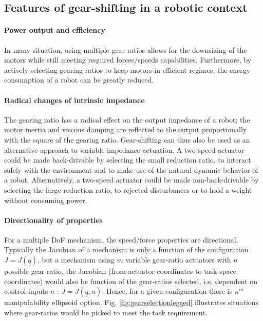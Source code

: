 \subsection{Features of gear-shifting in a robotic context}

\paragraph{Power output and efficiency}
In many situation, using multiple gear ratios allows for the downsizing of the motors while still meeting required forces/speeds capabilities. Furthermore, by actively selecting gearing ratios to keep motors in efficient regimes, the energy consumption of a robot can be greatly reduced. 

\paragraph{Radical changes of intrinsic impedance}
The gearing ratio has a radical effect on the output impedance of a robot; the motor inertia and viscous damping are reflected to the output proportionally with the square of the gearing ratio. Gear-shifting can thus also be used as an alternative approach to variable impedance actuation. A two-speed actuator could be made back-drivable by selecting the small reduction ratio, to interact safely with the environment and to make use of the natural dynamic behavior of a robot.  Alternatively, a two-speed actuator could be made non-back-drivable by selecting the large reduction ratio, to rejected disturbances or to hold a weight without consuming power.

\paragraph{Directionality of properties}
For a multiple DoF mechanism, the speed/force properties are directional. Typically the Jacobian of a mechanism is only a function of the configuration $J=J(\underline{q})$, but a mechanism using $m$ variable gear-ratio actuators with $n$ possible gear-ratio, the Jacobian (from actuator coordinates to task-space coordinates) would also be function of the gear-ratios selected, i.e. dependent on control inputs $\underline{u}$ : $J=J(\underline{q},\underline{u})$. Hence, for a given configuration there is $n^m$ manipulability ellipsoid option. Fig. \ref{fig:gearselectionlegged} illustrates situations where gear-ratios would be picked to meet the task requirement.


